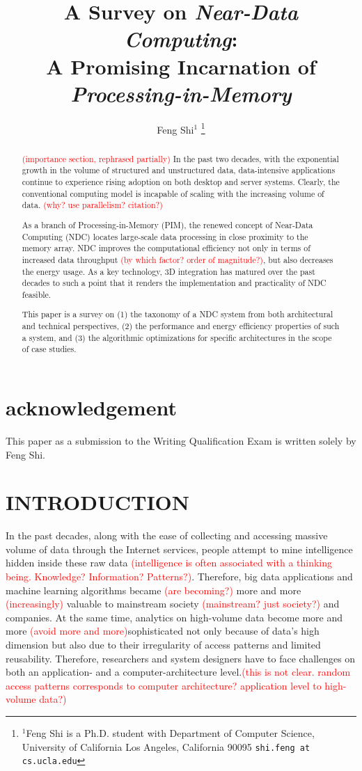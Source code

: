 \documentclass[letterpaper, 11pt, conference, margin=1in]{ieeeconf}   %
\title{\LARGE \bf
A Survey on \textit{Near-Data Computing}: \\ A Promising Incarnation of \textit{Processing-in-Memory}
}
\author{Feng Shi$^{1}$ %
\thanks{$^{1}$Feng Shi is a Ph.D. student with Department of Computer Science,
        University of California Los Angeles, California 90095
        {\tt\small shi.feng at cs.ucla.edu} }%
}
\newcommand\myworries[1]{\textcolor{red}{(#1)}}
\begin{document}
\maketitle
\thispagestyle{empty}
\pagestyle{empty}

\begin{abstract}
\myworries{importance section, rephrased partially}
In the past two decades, with the exponential growth in the volume of structured and unstructured data, data-intensive applications continue to experience rising adoption on both desktop and server systems. Clearly, the conventional computing model is incapable of scaling with the increasing volume of data. \myworries{why? use parallelism? citation?}

As a branch of Processing-in-Memory (PIM), the renewed concept of Near-Data Computing (NDC) locates large-scale data processing in close proximity to the memory array. NDC improves the computational efficiency not only in terms of increased data throughput \myworries{by which factor? order of magnitude?}, but also decreases the energy usage. As a key technology, 3D integration has matured over the past decades to such a point that it renders the implementation and practicality of NDC feasible.

This paper is a survey on (1) the taxonomy of a NDC system from both architectural and technical perspectives, (2) the performance and energy efficiency properties of such a system, and (3) the algorithmic optimizations for specific architectures in the scope of case studies.
\end{abstract}


\section*{\textbf{acknowledgement}}
This paper as a submission to the Writing Qualification Exam is written solely by Feng Shi.

\section{INTRODUCTION}
In the past decades, along with the ease of collecting and accessing massive volume of data through the Internet services, people attempt to mine intelligence hidden inside these raw data \myworries{intelligence is often associated with a thinking being. Knowledge? Information? Patterns?}. Therefore, big data applications and machine learning algorithms became \myworries{are becoming?} more and more \myworries{increasingly} valuable to mainstream society \myworries{mainstream? just society?} and companies. At the same time, analytics on high-volume data become more and more \myworries{avoid more and more}sophisticated not only because of data's high dimension but also due to their irregularity of access patterns and limited reusability.
Therefore, researchers and system designers have to face challenges on both an application- and a computer-architecture level.\myworries{this is not clear. random access patterns corresponds to computer architecture? application level to high-volume data?}
\end{document}
